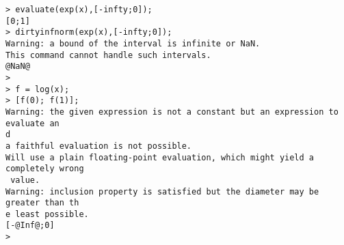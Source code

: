 \begin{center}\begin{minipage}{15cm}\begin{Verbatim}[frame=single]
> evaluate(exp(x),[-infty;0]);
[0;1]
> dirtyinfnorm(exp(x),[-infty;0]);
Warning: a bound of the interval is infinite or NaN.
This command cannot handle such intervals.
@NaN@
> 
> f = log(x);
> [f(0); f(1)];
Warning: the given expression is not a constant but an expression to evaluate an
d
a faithful evaluation is not possible.
Will use a plain floating-point evaluation, which might yield a completely wrong
 value.
Warning: inclusion property is satisfied but the diameter may be greater than th
e least possible.
[-@Inf@;0]
> 
\end{Verbatim}
\end{minipage}\end{center}
